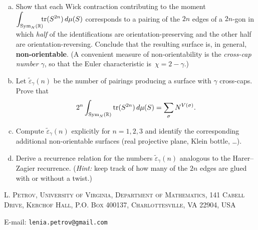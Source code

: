 \documentclass[letterpaper,11pt,oneside,reqno]{article}
\numberwithin{equation}{section}
\theoremstyle{definition}
\begin{document}
\begin{enumerate}[(a)]
  \item
  Show that each Wick contraction contributing to the moment
  $\displaystyle\int_{\operatorname{Sym}_{N}(\Bbb R)}\!\!\!\operatorname{tr}(S^{2n})\,d\mu(S)$
  corresponds to a pairing of the $2n$ edges of a $2n$-gon in which
  \emph{half} of the identifications are orientation-preserving and the
  other half are orientation-reversing.  Conclude that the resulting
  surface is, in general, \textbf{non-orientable}.
  (A convenient measure of non-orientability is the \emph{cross-cap number}
  $\gamma$, so that the Euler characteristic is $\,\chi=2-\gamma$.)

  \item
  Let $\tilde\varepsilon_\gamma(n)$ be the number of pairings producing a
  surface with $\gamma$ cross-caps.
  Prove that
  \[
    2^n\int_{\operatorname{Sym}_{N}(\Bbb R)}\operatorname{tr}(S^{2n})\,d\mu(S)
		=
		\sum_{\sigma}N^{V(\sigma)}.
  \]

  \item
  Compute $\tilde\varepsilon_\gamma(n)$ explicitly for $n=1,2,3$
  and identify the corresponding additional non-orientable surfaces
  (real projective plane, Klein bottle, \dots).

  \item
  Derive a recurrence relation for the numbers $\tilde\varepsilon_\gamma(n)$
	analogous to the Harer–Zagier recurrence.
  (\emph{Hint:} keep track of how
  many of the $2n$ edges are glued with or without a twist.)
\end{enumerate}








\medskip

\textsc{L. Petrov, University of Virginia, Department of Mathematics, 141 Cabell Drive, Kerchof Hall, P.O. Box 400137, Charlottesville, VA 22904, USA}

E-mail: \texttt{lenia.petrov@gmail.com}
\end{document}
